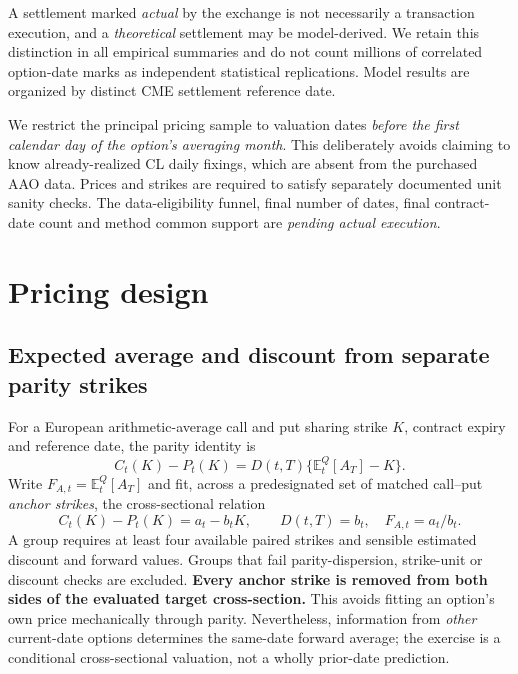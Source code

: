 \documentclass[a4paper,fleqn]{cas-dc}
\begin{document}
A settlement marked \emph{actual} by the exchange is not necessarily
a transaction execution, and a \emph{theoretical} settlement may be
model-derived. We retain this distinction in all empirical summaries
and do not count millions of correlated option-date marks as
independent statistical replications. Model results are organized by
distinct CME settlement reference date.

We restrict the principal pricing sample to valuation dates
\emph{before the first calendar day of the option's averaging month}.
This deliberately avoids claiming to know already-realized CL daily
fixings, which are absent from the purchased AAO data. Prices and
strikes are required to satisfy separately documented unit
sanity checks. The data-eligibility funnel, final number of
dates, final contract-date count and method common support
are \textit{pending actual execution}.

\section{Pricing design}
\label{sec:db_method}

\subsection{Expected average and discount from separate parity strikes}

For a European arithmetic-average call and put sharing strike $K$,
contract expiry and reference date, the parity identity is
\begin{equation}
 C_t(K)-P_t(K)
 =D(t,T)\{\mathbb{E}_t^Q[A_T]-K\}.
 \label{eq:db_parity}
\end{equation}
Write $F_{A,t}=\mathbb{E}_t^Q[A_T]$ and
fit, across a predesignated set of matched call--put
\emph{anchor strikes}, the cross-sectional relation
\begin{equation}
 C_t(K)-P_t(K)=a_t-b_t K,\qquad
 D(t,T)=b_t,\quad F_{A,t}=a_t/b_t.
 \label{eq:db_reg}
\end{equation}
A group requires at least four available paired strikes and
sensible estimated discount and forward values. Groups that
fail parity-dispersion, strike-unit or discount checks are excluded.
\textbf{Every anchor strike is removed from both sides of the
evaluated target cross-section.} This avoids fitting an option's
own price mechanically through parity. Nevertheless, information
from \emph{other} current-date options determines the same-date
forward average; the exercise is a conditional cross-sectional
valuation, not a wholly prior-date prediction.
\end{document}
